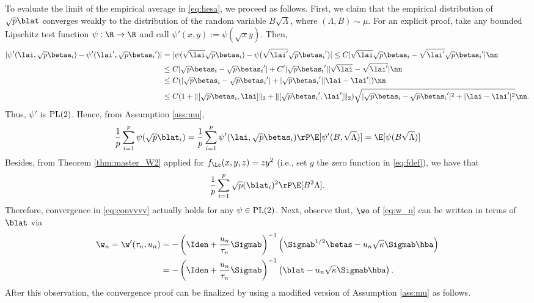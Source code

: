 To evaluate the limit of the empirical average in \eqref{eq:hesa}, we proceed as follows. First, we claim that the empirical distribution of $\sqrt{p}\blat$ converges weakly to the distribution of the random variable $B\sqrt{\Lambda}$, where $(\Lambda,B)\sim\mu$. 
For an explicit proof, take any bounded Lipschitz test function $\psi:\R\rightarrow\R$ and call $\psi'(x,y):=\psi({\sqrt{x}}y)$. Then, 
\begin{align}
|\psi'(\lai,\sqrt{p}\betas_i)-\psi'(\lai',\sqrt{p}{\betas_i}')| &= |\psi(\sqrt{\lai}\sqrt{p}\betas_i)-\psi(\sqrt{\lai'}\sqrt{p}{\betas_i}')| \leq C |\sqrt{\lai}\sqrt{p}\betas_i - \sqrt{\lai'}\sqrt{p}{\betas_i}'| \nn
\\
&\leq
C |\sqrt{p}\betas_i - \sqrt{p}{\betas_i}'| + C'|\sqrt{p}{\betas_i}'| |\sqrt{\lai}- \sqrt{\lai'}|\nn  \\
&\leq
C (|\sqrt{p}\betas_i - \sqrt{p}{\betas_i}'| + |\sqrt{p}{\betas_i}'| |{\lai}- {\lai'}|)\nn  \\
&\leq
C (1 + \|[\sqrt{p}\betas_i,\lai]\|_2 +\|[\sqrt{p}{\betas_i}',\lai']\|_2 ) \sqrt{|\sqrt{p}\betas_i - \sqrt{p}{\betas_i}'|^2   + |{\lai}- {\lai'}|^2}\nn.
\end{align}
Thus, $\psi'$ is $\rm{PL(2)}$. Hence, from Assumption \ref{ass:mu},
\begin{align}
\frac{1}{p}\sum_{i=1}^p \psi(\sqrt{p}\blat_i) = \frac{1}{p}\sum_{i=1}^p \psi'(\lai,\sqrt{p}\betas_i) \rP  \E[\psi'(B,\sqrt{\Lambda})] =  \E[\psi(B\sqrt{\Lambda})]\label{eq:convvvv}
\end{align}
Besides, from Theorem \ref{thm:master_W2} applied for $f_\Lc(x,y,z)=zy^2$ (i.e., set $g$ the zero function in \eqref{eq:fdef}), we have that
$$
\frac{1}{p}\sum_{i=1}^p \sqrt{p}(\blat_i)^2 \rP  \E[B^2\Lambda].
$$
Therefore, convergence in \eqref{eq:convvvv} actually holds for any $\psi\in\rm{PL}(2)$. Next, observe that, $\wo$ of \eqref{eq:w_n} can be written in terms of $\blat$ via \begin{align}\label{eq:w_n2}
\w_n=\w'(\tau_n,u_n)& = -\left(\Iden+\frac{u_n}{\tau_n}\Sigmab\right)^{-1}\left(\Sigmab^{1/2}\betas-u_n\sqrt{\kappa}\Sigmab\hba\right)\\
&=-\left(\Iden+\frac{u_n}{\tau_n}\Sigmab\right)^{-1}\left(\blat-u_n\sqrt{\kappa}\Sigmab\hba\right).
\end{align}
After this observation, the convergence proof can be finalized by using a modified version of Assumption \ref{ass:mu} as follows.%

